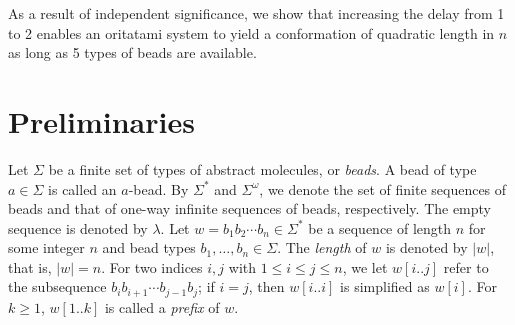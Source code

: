 \documentclass[runningheads]{llncs}
\begin{document}
As a result of independent significance, we show that increasing the delay from 1 to 2 enables an oritatami system to yield a conformation of quadratic length in $n$ as long as 5 types of beads are available. 

	\section{Preliminaries}\label{sec:preliminaries}

Let $\Sigma$ be a finite set of types of abstract molecules, or \textit{beads}. 
A bead of type $a \in \Sigma$ is called an $a$-bead. 
By $\Sigma^*$ and $\Sigma^\omega$, we denote the set of finite sequences of beads and that of one-way infinite sequences of beads, respectively. 
The empty sequence is denoted by $\lambda$. 
Let $w = b_1 b_2 \cdots b_n \in \Sigma^*$ be a sequence of length $n$ for some integer $n$ and bead types $b_1, \ldots, b_n \in \Sigma$. 
The \textit{length} of $w$ is denoted by $|w|$, that is, $|w| = n$. 
For two indices $i, j$ with $1 \le i \le j \le n$, we let $w[i..j]$ refer to the subsequence $b_i b_{i+1} \cdots b_{j-1}b_j$; if $i = j$, then $w[i..i]$ is simplified as $w[i]$. 
For $k \ge 1$, $w[1..k]$ is called a \textit{prefix} of $w$. 
\end{document}
